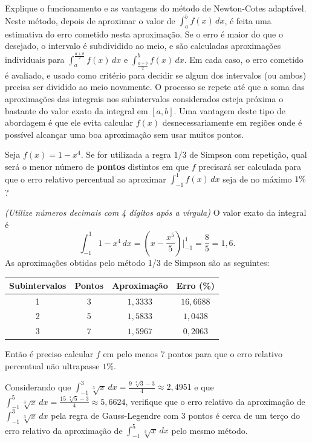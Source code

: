 \documentclass[12pt,a4paper]{article}
\begin{document}
\begin{ExerciseList}
\Exercise[title={1,0}]
Explique o funcionamento e as vantagens do método de Newton-Cotes adaptável.
\Answer
Neste método, depois de aproximar o valor de $\int_a^b f(x)\,dx$, é feita uma estimativa do erro cometido nesta aproximação. Se o erro é maior do que o desejado, o intervalo é subdividido ao meio, e são calculadas aproximações individuais para $\int_a^{\frac{a+b}{2}} f(x)\,dx$ e $\int_{\frac{a+b}{2}}^b f(x)\,dx$. Em cada caso, o erro cometido é avaliado, e usado como critério para decidir se algum dos intervalos (ou ambos) precisa ser dividido ao meio novamente. O processo se repete até que a soma das aproximações das integrais nos subintervalos considerados esteja próxima o bastante do valor exato da integral em $[a,b]$. Uma vantagem deste tipo de abordagem é que ele evita calcular $f(x)$ desnecessariamente em regiões onde é possível alcançar uma boa aproximação sem usar muitos pontos.

\Exercise[title={3,0}]
Seja $f(x) = 1-x^4$. Se for utilizada a regra
$1/3$ de Simpson com repetição, qual será o menor número de \textbf{pontos} distintos em que $f$ precisará ser calculada para que o erro relativo percentual ao aproximar $\int_{-1}^1 f(x)\, dx$ seja de no máximo $1\%$?

{\color{blue} \textit{(Utilize números decimais com 4 dígitos após a vírgula)}}
\Answer O valor exato da integral é
\[
\int_{-1}^1 1-x^4\, dx
= \left(x-\frac{x^5}{5} \right)\Big|_{-1}^1 = \frac{8}{5} = 1,6.
\]
As aproximações obtidas pelo método 1/3 de Simpson são as seguintes:
\medskip
\begin{center}
\begin{tabular}{|c|c|c|c|}
\hline 
Subintervalos & Pontos & Aproximação & Erro (\%) \\ 
\hline 
1 & 3 & $1,3333$ & $16,6688$ \\ 
\hline 
2 & 5 & $1,5833$ & $1,0438$ \\ 
\hline 
3 & 7 & $1,5967$ & $0,2063$ \\ 
\hline 
\end{tabular}
\end{center}
\medskip
Então é preciso calcular $f$ em pelo menos 7 pontos para que o erro relativo percentual não ultrapasse $1\%$.

\Exercise[title={3,0}] Considerando que
$\int_{-1}^3 \sqrt[3]{x}\, dx
= \frac{9 \; \sqrt[3]{3} - 3}{4}
\approx 2,4951$
e que
$\int_{-1}^5 \sqrt[3]{x}\, dx
= \frac{15 \; \sqrt[3]{5} - 3}{4}
\approx 5,6624$, verifique que o erro relativo da aproximação de $\int_{-1}^3 \sqrt[3]{x}\, dx$ pela regra de Gauss-Legendre com 3 pontos é cerca de um terço do erro relativo da aproximação de $\int_{-1}^5 \sqrt[3]{x}\, dx$ pelo mesmo método.


\end{ExerciseList}
\end{document}
